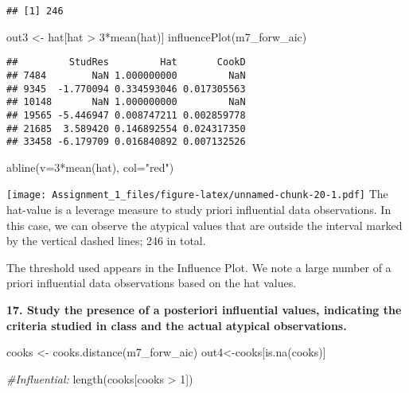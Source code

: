 \documentclass[
]{article}
\newenvironment{Shaded}{\begin{snugshade}}{\end{snugshade}}
\newcommand{\AttributeTok}[1]{\textcolor[rgb]{0.77,0.63,0.00}{#1}}
\newcommand{\CommentTok}[1]{\textcolor[rgb]{0.56,0.35,0.01}{\textit{#1}}}
\newcommand{\DecValTok}[1]{\textcolor[rgb]{0.00,0.00,0.81}{#1}}
\newcommand{\FunctionTok}[1]{\textcolor[rgb]{0.00,0.00,0.00}{#1}}
\newcommand{\NormalTok}[1]{#1}
\newcommand{\OtherTok}[1]{\textcolor[rgb]{0.56,0.35,0.01}{#1}}
\newcommand{\SpecialCharTok}[1]{\textcolor[rgb]{0.00,0.00,0.00}{#1}}
\newcommand{\StringTok}[1]{\textcolor[rgb]{0.31,0.60,0.02}{#1}}
\begin{document}
\begin{verbatim}
## [1] 246
\end{verbatim}

\begin{Shaded}
\begin{Highlighting}[]
\NormalTok{out3 }\OtherTok{\textless{}{-}}\NormalTok{ hat[hat }\SpecialCharTok{\textgreater{}} \DecValTok{3}\SpecialCharTok{*}\FunctionTok{mean}\NormalTok{(hat)]}
\FunctionTok{influencePlot}\NormalTok{(m7\_forw\_aic)}
\end{Highlighting}
\end{Shaded}

\begin{verbatim}
##         StudRes         Hat       CookD
## 7484        NaN 1.000000000         NaN
## 9345  -1.770094 0.334593046 0.017305563
## 10148       NaN 1.000000000         NaN
## 19565 -5.446947 0.008747211 0.002859778
## 21685  3.589420 0.146892554 0.024317350
## 33458 -6.179709 0.016840892 0.007132526
\end{verbatim}

\begin{Shaded}
\begin{Highlighting}[]
\FunctionTok{abline}\NormalTok{(}\AttributeTok{v=}\DecValTok{3}\SpecialCharTok{*}\FunctionTok{mean}\NormalTok{(hat), }\AttributeTok{col=}\StringTok{"red"}\NormalTok{)}
\end{Highlighting}
\end{Shaded}

\texttt{[image: Assignment\_1\_files/figure-latex/unnamed-chunk-20-1.pdf]}
The hat-value is a leverage measure to study priori influential data
observations. In this case, we can observe the atypical values that are
outside the interval marked by the vertical dashed lines; 246 in total.

The threshold used appears in the Influence Plot. We note a large number
of a priori influential data observations based on the hat values.

\newpage

\textbf{17. Study the presence of a posteriori influential values, indicating the criteria studied in class and the actual atypical observations.}

\begin{Shaded}
\begin{Highlighting}[]
\NormalTok{cooks }\OtherTok{\textless{}{-}} \FunctionTok{cooks.distance}\NormalTok{(m7\_forw\_aic)}
\NormalTok{out4}\OtherTok{\textless{}{-}}\NormalTok{cooks[}\FunctionTok{is.na}\NormalTok{(cooks)]}

\CommentTok{\#Influential:}
\FunctionTok{length}\NormalTok{(cooks[cooks }\SpecialCharTok{\textgreater{}} \DecValTok{1}\NormalTok{])}
\end{Highlighting}
\end{Shaded}
\end{document}
